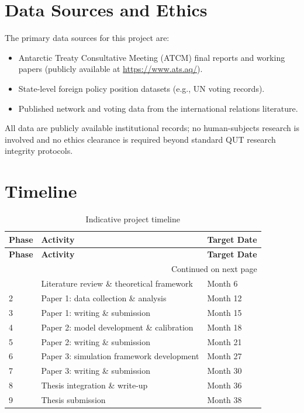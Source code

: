 
\section{Data Sources and Ethics}
\label{sec:data}

The primary data sources for this project are:

\begin{itemize}
  \item Antarctic Treaty Consultative Meeting (ATCM) final reports and working papers
        (publicly available at \url{https://www.ats.aq/}).
  \item State-level foreign policy position datasets (e.g., UN voting records).
  \item Published network and voting data from the international relations literature.
\end{itemize}

All data are publicly available institutional records; no human-subjects research is
involved and no ethics clearance is required beyond standard QUT research integrity
protocols.

\section{Timeline}
\label{sec:timeline}

\begin{longtable}{lll}
  \caption{Indicative project timeline} \label{tab:timeline} \\
  \toprule
  \textbf{Phase} & \textbf{Activity} & \textbf{Target Date} \\
  \midrule
  \endfirsthead
  \toprule
  \textbf{Phase} & \textbf{Activity} & \textbf{Target Date} \\
  \midrule
  \endhead
  \midrule
  \multicolumn{3}{r}{\small Continued on next page} \\
  \endfoot
  \bottomrule
  \endlastfoot
  1  & Literature review \& theoretical framework      & Month 6  \\
  2  & Paper 1: data collection \& analysis            & Month 12 \\
  3  & Paper 1: writing \& submission                  & Month 15 \\
  4  & Paper 2: model development \& calibration       & Month 18 \\
  5  & Paper 2: writing \& submission                  & Month 21 \\
  6  & Paper 3: simulation framework development       & Month 27 \\
  7  & Paper 3: writing \& submission                  & Month 30 \\
  8  & Thesis integration \& write-up                  & Month 36 \\
  9  & Thesis submission                               & Month 38 \\
\end{longtable}

